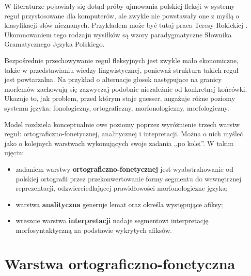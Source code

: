\documentclass{article}
\begin{document}
W literaturze pojawiały się dotąd próby ujmowania polskiej fleksji w systemy reguł przystosowane dla komputerów,
ale zwykle nie powstawały one z myślą o klasyfikacji słów nieznanych.
Przykładem może być tutaj praca Teresy Rokickiej \cite{rok}.
Ukoronowaniem tego rodzaju wysiłków są wzory paradygmatyczne Słownika Gramatycznego Języka Polskiego.

Bezpośrednie przechowywanie reguł fleksyjnych jest zwykle mało ekonomiczne, także w przedstawianiu wiedzy lingwistycznej, ponieważ struktura takich reguł jest powtarzalna.
Na przykład o alternacje głosek następujące na granicy morfemów zachowują się zazwyczaj podobnie niezależnie od konkretnej końcówki.
Ukazuje to, jak problem, przed którym staje guesser, angażuje różne poziomy systemu języka:
fonologiczny, ortograficzny, morfonologiczny, morfologiczny.

Model rozdziela konceptualnie owe poziomy %
poprzez wyróżnienie trzech warstw reguł: ortograficzno-fonetycznej, analitycznej i intepretacji.
Można o nich myśleć jako o kolejnych warstwach wykonujących swoje zadania ,,po kolei''. W takim ujęciu:
\begin{itemize}
	\item zadaniem warstwy \textbf{ortograficzno-fonetycznej} jest wyabstrahowanie od polskiej ortografii przez przekonwertowanie formy segmentu do wewnętrznej reprezentacji, odzwierciedlającej prawidłowości morfonologiczne języka;
	\item warstwa \textbf{analityczna} generuje lemat oraz określa występujące afiksy;
	\item wreszcie warstwa \textbf{interpretacji} nadaje segmentowi interpretację morfosyntaktyczną na podstawie wykrytych afiksów.
\end{itemize}

\section{Warstwa ortograficzno-fonetyczna}\label{sec_phon}
\end{document}
